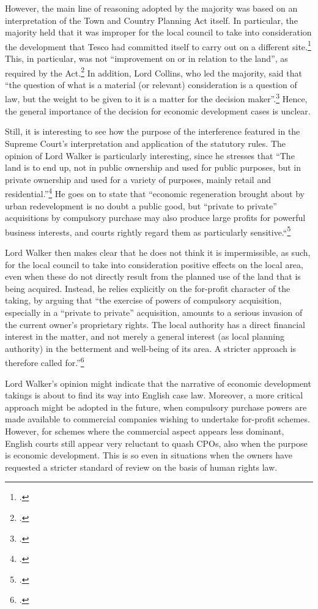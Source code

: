 However, the main line of reasoning adopted by the majority was based on an interpretation of the Town and Country Planning Act itself. In particular, the majority held that it was improper for the local council to take into consideration the development that Tesco had committed itself to carry out on a different site.\footcite[73-79]{sainsbury10} This, in particular, was not ``improvement on or in relation to the land'', as required by the Act.\footcite[336]{tcpa90} In addition, Lord Collins, who led the majority, said that ``the question of what is a material (or relevant) consideration is a question of law, but the weight to be given to it is a matter for the decision maker''.\footcite[70]{sainsbury10} Hence, the general importance of the decision for economic development cases is unclear.

Still, it is interesting to see how the purpose of the interference featured in the Supreme Court's interpretation and application of the statutory rules. The opinion of Lord Walker is particularly interesting, since he stresses that ``The land is to end up, not in public ownership and used for public purposes, but in private ownership and used for a variety of purposes, mainly retail and residential.''\footcite[81]{sainsbury10} He goes on to state that ``economic regeneration brought about by urban redevelopment is no doubt a public good, but ``private to private'' acquisitions by compulsory purchase may also produce large profits for powerful business interests, and courts rightly regard them as particularly sensitive.``\footcite[81]{sainsbury10}

Lord Walker then makes clear that he does not think it is impermissible, as such, for the local council to take into consideration positive effects on the local area, even when these do not directly result from the planned use of the land that is being acquired. Instead, he relies explicitly on the for-profit character of the taking, by arguing that ``the exercise of powers of compulsory acquisition, especially in a ``private to private'' acquisition, amounts to a serious invasion of the current owner's proprietary rights. The local authority has a direct financial interest in the matter, and not merely a general interest (as local planning authority) in the betterment and well-being of its area. A stricter approach is therefore called for.''\footcite[84]{sainsbury10} 

Lord Walker's opinion might indicate that the narrative of economic development takings is about to find its way into English case law. Moreover, a more critical approach might be adopted in the future, when compulsory purchase powers are made available to commercial companies wishing to undertake for-profit schemes. However, for schemes where the commercial aspect appears less dominant, English courts still appear very reluctant to quash CPOs, also when the purpose is economic development. This is so even in situations when the owners have requested a stricter standard of review on the basis of human rights law. 

